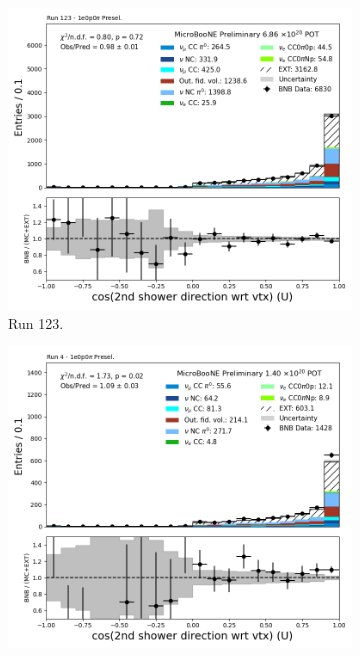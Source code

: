 \begin{figure}[H]
    \centering
    \begin{subfigure}[t]{0.32\linewidth}
        \includegraphics[width=\linewidth]{technote/Appendix_Preselection/Figures/1e0p0pi/Run123/secondshower_U_dot_Run123_1e0p0pi_Presel.png}
        \caption{Run 123.}
    \end{subfigure}%
    \hspace{0.2cm}%
    \begin{subfigure}[t]{0.32\linewidth}
        \includegraphics[width=\linewidth]{technote/Appendix_Preselection/Figures/1e0p0pi/Run4b/secondshower_U_dot_Run4b_1e0p0pi_Presel.png}

\end{subfigure}
\end{figure}
